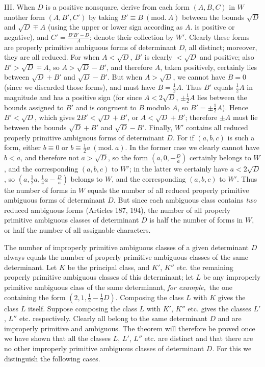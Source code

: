 III. When $D$ is a positive nonsquare, derive from each form $(A,B,C)$ in $W$ another form $(A,B',C')$ by taking $B'\equiv B\ (\mathrm{mod.}\ A)$ between the bounds $\sqrt{D}$ and $\sqrt{D}\mp A$ (using the upper or lower sign according as $A$. is positive or negative), and $C'=\frac{B'B'-D}{A}$; denote their collection by $W'$. Clearly these forms are properly primitive ambiguous forms of determinant $D$, all distinct; moreover, they are all reduced. For when $A<\sqrt{D}$, $B'$ is clearly $<\sqrt{D}$ and positive; also $B'>\sqrt{D}\mp A$, so $A>\sqrt{D}-B'$, and therefore $A$, taken positively, certainly lies between $\sqrt{D}+B'$ and $\sqrt{D}-B'$. But when $A>\sqrt{D}$, we cannot have $B=0$ (since we discarded those forms), and must have $B=\frac12 A$. Thus $B'$ equals $\frac12 A$ in magnitude and has a positive sign (for since $A<2\sqrt{D}$, $\pm\frac12 A$ lies between the bounds assigned to $B'$ and is congruent to $B$ modulo $A$, so $B'=\pm\frac12 A$). Hence $B'<\sqrt{D}$, which gives $2B'<\sqrt{D}+B'$, or $A<\sqrt{D}+B'$; therefore $\pm A$ must lie between the bounds $\sqrt{D}+B'$ and $\sqrt{D}-B'$. Finally, $W'$ contains all reduced properly primitive ambiguous forms of determinant $D$. For if $(a,b,c)$ is such a form, either $b\equiv0$ or $b\equiv\frac12 a\ (\mathrm{mod.}\ a)$. In the former case we clearly cannot have $b<a$, and therefore not $a>\sqrt{D}$, so the form $\left(a,0,-\frac{D}{a}\right)$ certainly belongs
to $W$, and the corresponding $(a,b,c)$ to $W'$; in the latter we certainly have $a<2\sqrt{D}$, so $\left(a,\allowbreak \frac12 a,\allowbreak \frac14 a-\frac{D}{a}\right)$ belongs to $W$, and the corresponding $(a,b,c)$ to $W'$. Thus the number of forms in $W$ equals the number of all reduced properly primitive ambiguous forms of determinant $D$. But since each ambiguous class contains \textit{two} reduced ambiguous forms (Articles 187, 194), the number of all properly primitive ambiguous classes of determinant $D$ is half the number of forms in $W$, or half the number of all assignable characters.

The number of improperly primitive ambiguous classes of a given determinant $D$ always equals the number of properly primitive ambiguous classes of the same determinant. Let $K$ be the principal class, and $K'$, $K''$ etc. the remaining properly primitive ambiguous classes of this determinant; let $L$ be any improperly primitive ambiguous class of the same determinant, \textit{for example,}\ the one containing the form $(2,1,\frac12-\frac12 D)$. Composing the class $L$ with $K$ gives the class $L$ itself. Suppose composing the class $L$ with $K'$, $K''$ etc. gives the classes $L'$, $L''$ etc. respectively. Clearly all belong to the same determinant $D$ and are improperly primitive and ambiguous. The theorem will therefore be proved once we have shown that all the classes $L$, $L'$, $L''$ etc. are distinct and that there are no other improperly primitive ambiguous classes of determinant $D$. For this we distinguish the following cases.

